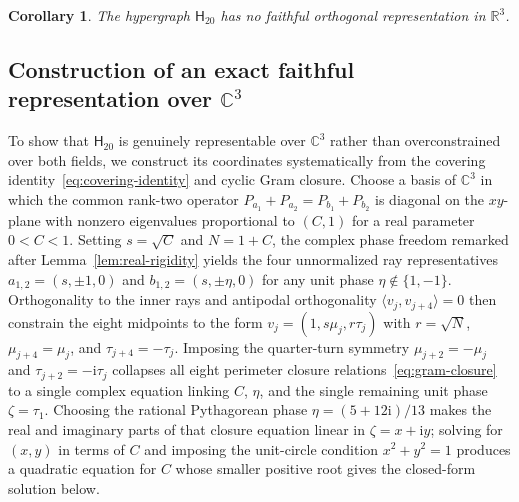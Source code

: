 \documentclass[twocolumn,aps,pra,floatfix,amsmath,amssymb,longbibliography]{revtex4-2}
\newenvironment{handrewrite}{\leavevmode\color{blue}}{}
\newtheorem{corollary}[theorem]{Corollary}
\theoremstyle{definition}
\theoremstyle{remark}
\newcommand{\ii}{\mathrm{i}}
\newcommand{\C}{\mathbb C}
\newcommand{\R}{\mathbb R}
\newcommand{\Htwenty}{\mathsf H_{20}}
\begin{document}
\begin{corollary}
\label{cor:h20-real}
The hypergraph $\Htwenty$ has no faithful orthogonal representation in
$\R^3$.
\end{corollary}

\subsection{Construction of an exact faithful representation over
\texorpdfstring{$\C^3$}{C3}}

\begin{handrewrite}
To show that $\Htwenty$ is genuinely representable over $\C^3$ rather than
overconstrained over both fields, we construct its coordinates systematically
from the covering identity~\eqref{eq:covering-identity} and cyclic Gram
closure.  Choose a basis of $\C^3$ in which the common rank-two operator
$P_{a_1}+P_{a_2}=P_{b_1}+P_{b_2}$ is diagonal on the $xy$-plane with nonzero
eigenvalues proportional to $(C,1)$ for a real parameter $0<C<1$.  Setting
$s=\sqrt C$ and $N=1+C$, the complex phase freedom remarked after
Lemma~\ref{lem:real-rigidity} yields the four unnormalized ray
representatives $a_{1,2}=(s,\pm1,0)$ and $b_{1,2}=(s,\pm\eta,0)$ for any unit
phase $\eta\notin\{1,-1\}$.  Orthogonality to the inner rays and antipodal
orthogonality $\langle v_j,v_{j+4}\rangle=0$ then constrain the eight
midpoints to the form $v_j=(1,s\mu_j,r\tau_j)$ with $r=\sqrt N$,
$\mu_{j+4}=\mu_j$, and $\tau_{j+4}=-\tau_j$.  Imposing the quarter-turn
symmetry $\mu_{j+2}=-\mu_j$ and $\tau_{j+2}=-\ii\tau_j$ collapses all eight
perimeter closure relations~\eqref{eq:gram-closure} to a single complex
equation linking $C$, $\eta$, and the single remaining unit phase
$\zeta=\tau_1$.  Choosing the rational Pythagorean phase
$\eta=(5+12\ii)/13$ makes the real and imaginary parts of that closure
equation linear in $\zeta=x+\ii y$; solving for $(x,y)$ in terms of $C$ and
imposing the unit-circle condition $x^2+y^2=1$ produces a quadratic equation
for $C$ whose smaller positive root gives the closed-form solution below.
\end{handrewrite}
\end{document}
